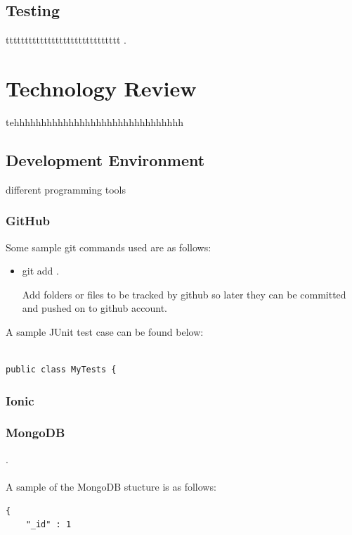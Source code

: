 \section{Testing}
tttttttttttttttttttttttttttttt
\cite{FirstnameLastname}.


\chapter{Technology Review}
tehhhhhhhhhhhhhhhhhhhhhhhhhhhhhhh

\section{Development Environment}
different programming tools


\subsection{GitHub}

Some sample git commands used are as follows:
\begin{itemize}

    \item git add .\par
    Add folders or files to be tracked by github so later they can be
    committed and pushed on to github account.

\end{itemize}


A sample JUnit test case can be found below\cite{JUnit}:

\begin{verbatim}

public class MyTests {

\end{verbatim}

\subsection{Ionic}

\subsection{MongoDB}
\cite{mLab}.\\
\\
A sample of the MongoDB stucture is as follows\cite{WilliamZola}:
\begin{verbatim}
{
    "_id" : 1

\end{verbatim}


